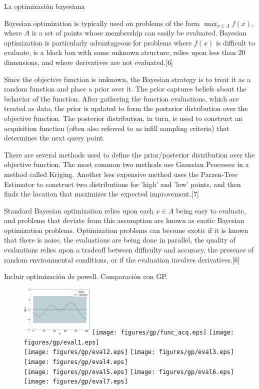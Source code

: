 La optimización bayesiana 

Bayesian optimization is typically used on problems of the form 
$\max _{x\in A}f(x)$, where $A$ is a set of points whose membership can 
easily be evaluated. Bayesian optimization is particularly advantageous 
for problems where $f(x)$ is difficult to evaluate, is a black box with 
some unknown structure, relies upon less than 20 dimensions, and where 
derivatives are not evaluated.[6]

Since the objective function is unknown, the Bayesian strategy is to 
treat it as a random function and place a prior over it. The prior 
captures beliefs about the behavior of the function. After gathering the 
function evaluations, which are treated as data, the prior is updated to 
form the posterior distribution over the objective function. The 
posterior distribution, in turn, is used to construct an acquisition 
function (often also referred to as infill sampling criteria) that 
determines the next query point.

There are several methods used to define the prior/posterior distribution 
over the objective function. The most common two methods use Gaussian 
Processes in a method called Kriging. Another less expensive method uses 
the Parzen-Tree Estimator to construct two distributions for 'high' and 
'low' points, and then finds the location that maximizes the expected 
improvement.[7]

Standard Bayesian optimization relies upon each $x\in A$ being easy to 
evaluate, and problems that deviate from this assumption are known as 
exotic Bayesian optimization problems. Optimization problems can become 
exotic if it is known that there is noise, the evaluations are being done 
in parallel, the quality of evaluations relies upon a tradeoff between 
difficulty and accuracy, the presence of random environmental conditions, 
or if the evaluation involves derivatives.[6]




{\color{red} Incluir optimización de powell. Comparación con GP.}


\begin{figure}[H]
\centering
 \includegraphics[width=0.31\textwidth]{figures/gp/funcion.eps} 
 \texttt{[image: figures/gp/func\_acq.eps]} 
 \texttt{[image: figures/gp/eval1.eps]} \\
  \texttt{[image: figures/gp/eval2.eps]}
  \texttt{[image: figures/gp/eval3.eps]}
  \texttt{[image: figures/gp/eval4.eps]} \\
  \texttt{[image: figures/gp/eval5.eps]}
  \texttt{[image: figures/gp/eval6.eps]}
  \texttt{[image: figures/gp/eval7.eps]} 
\end{figure}

